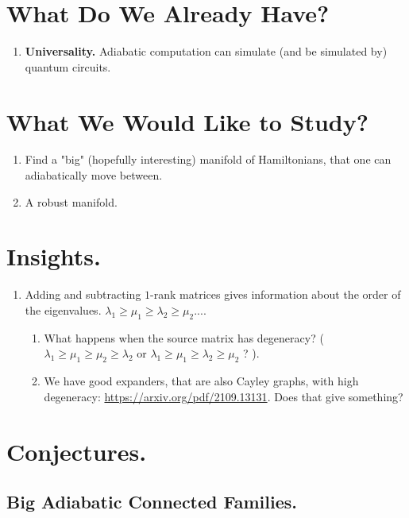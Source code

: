 \documentclass[manuscript,screen,review]{acmart}
\begin{document}
\section{What Do We Already Have?}
\begin{enumerate}
    \item \textbf{Universality.} Adiabatic computation can simulate (and be simulated by) quantum circuits.   
\end{enumerate}
\section{What We Would Like to Study?}
\begin{enumerate}
    \item Find a "big" (hopefully interesting) manifold of Hamiltonians, that one can adiabatically move between. 
    \item A robust manifold.   
\end{enumerate}

\section{Insights.}
\begin{enumerate}
    \item Adding and subtracting $1$-rank matrices gives information about the order of the eigenvalues. $\lambda_{1}\ge \mu_{1} \ge \lambda_{2} \ge \mu_{2} ...$. 
    \begin{enumerate}
        \item What happens when the source matrix has degeneracy?  ( $\lambda_{1} \ge \mu_{1} \ge \mu_{2} \ge \lambda_{2}$ or $\lambda_{1}\ge \mu_{1} \ge \lambda_{2} \ge \mu_{2}$ ? ). 
        \item We have good expanders, that are also Cayley graphs, with high degeneracy: \hyperlink{arxiv}{https://arxiv.org/pdf/2109.13131}. Does that give something? 
    \end{enumerate}
\end{enumerate}

\section{Conjectures.} 

\subsection{Big Adiabatic Connected Families.}
\end{document}
